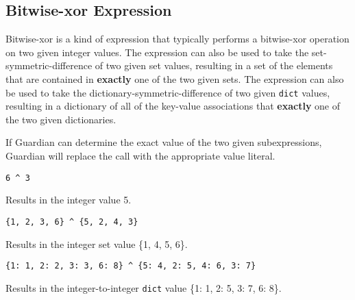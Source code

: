 
\subsection{Bitwise-xor Expression}
{
	Bitwise-xor is a kind of expression that typically performs
	a bitwise-xor operation on two given integer values.
	The expression can also be used to take the set-symmetric-difference
	of two given
	set values, resulting in a set of the elements that are contained in
	\textbf{exactly} one of the two given sets.
	The expression can also be used to take the
	dictionary-symmetric-difference of two given
	\texttt{dict} values, resulting in a dictionary of all of the key-value
	associations that \textbf{exactly} one of the two given
	dictionaries.
	
	If Guardian can determine the exact value of the two given subexpressions,
	Guardian will replace the call with the appropriate value literal.
	
	\begin{itemize}
	{
		\item[] \texttt{6 \^{} 3}
		
			Results in the integer value 5.
		
		\item[] \texttt{\{1, 2, 3, 6\} \^{} \{5, 2, 4, 3\}}
		
			Results in the integer set value \{1, 4, 5, 6\}.
		
		\item[] \texttt{\{1: 1, 2: 2, 3: 3, 6: 8\} \^{} \{5: 4, 2: 5, 4: 6, 3: 7\}}
		
			Results in the integer-to-integer \texttt{dict}
			value \{1: 1, 2: 5, 3: 7, 6: 8\}.
	}
	\end{itemize}
}
